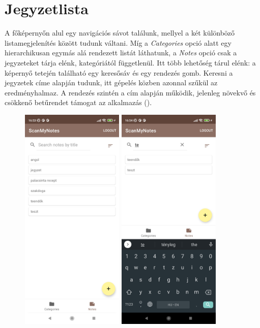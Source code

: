 \section{Jegyzetlista}
A főképernyőn alul egy navigációs sávot találunk, mellyel a két különböző listamegjelenítés között tudunk váltani. Míg a \emph{Categories} opció alatt egy hierarchikusan egymás alá rendezett listát láthatunk, a \emph{Notes} opció csak a jegyzeteket tárja elénk, kategóriától függetlenül. Itt több lehetőség tárul elénk: a képernyő tetején található egy keresősáv és egy rendezés gomb. Keresni a jegyzetek címe alapján tudunk, itt gépelés közben azonnal szűkül az eredményhalmaz. A rendezés szintén a cím alapján működik, jelenleg növekvő és csökkenő betűrendet támogat az alkalmazás ().

\begin{figure}[!ht]
	\centering
	\includegraphics[width=49mm, keepaspectratio]{figures/notelist_full.jpg}
	\includegraphics[width=49mm, keepaspectratio]{figures/notelist_search.jpg}

\end{figure}
